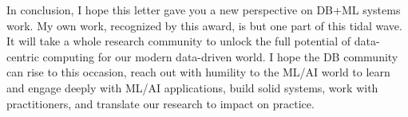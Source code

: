 \documentclass[11pt]{article}
\begin{document}
\vspace{6mm}
In conclusion, I hope this letter gave you a new perspective on DB+ML systems work. My own work, recognized by this award, 
is but one part of this tidal wave. It will take a whole research community to unlock the full potential of data-centric computing 
for our modern data-driven world. I hope the DB community can rise to this occasion, reach out with humility to the ML/AI world 
to learn and engage deeply with ML/AI applications, build solid systems, work with practitioners, and translate our research 
to impact on practice.


\end{document}
